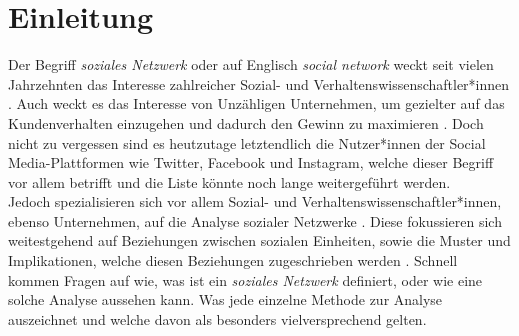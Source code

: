 \chapter{Einleitung}\label{ch:einleitung}
Der Begriff \textit{soziales Netzwerk} oder auf Englisch \textit{social network} weckt seit vielen Jahrzehnten das Interesse zahlreicher Sozial- und Verhaltenswissenschaftler*innen \cite{SNAIntroduction}. Auch weckt es das Interesse von Unzähligen Unternehmen, um gezielter auf das Kundenverhalten einzugehen und dadurch den Gewinn zu maximieren \cite{CompanySNA}. Doch nicht zu vergessen sind es heutzutage letztendlich die Nutzer*innen der Social Media-Plattformen wie Twitter, Facebook und Instagram, welche dieser Begriff vor allem betrifft und die Liste könnte noch lange weitergeführt werden.\\
Jedoch spezialisieren sich vor allem Sozial- und Verhaltenswissenschaftler*innen, ebenso Unternehmen, auf die Analyse sozialer Netzwerke \cite{SNAIntroduction, CompanySNA}. Diese fokussieren sich weitestgehend auf Beziehungen zwischen sozialen Einheiten, sowie die Muster und Implikationen, welche diesen Beziehungen zugeschrieben werden \cite{networkPattern}.
Schnell kommen Fragen auf wie, was ist ein \textit{soziales Netzwerk} definiert, oder wie eine solche Analyse aussehen kann. Was jede einzelne Methode zur Analyse auszeichnet und welche davon als besonders vielversprechend gelten.


